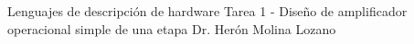 




	\pnormal
	{Lenguajes de descripción de hardware}
	{Tarea 1 - Diseño de amplificador operacional simple de una etapa}
	{Dr. Herón Molina Lozano}
	\tableofcontents
	
	\newpage 
	\newpage 
	\clearpage 
	\newpage 
	



